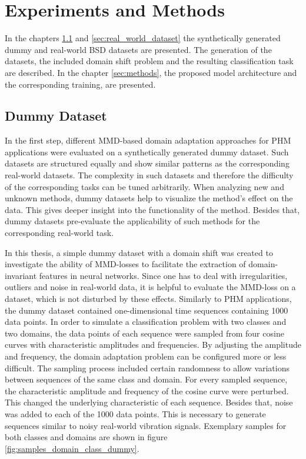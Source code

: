 \chapter{Experiments and Methods}\label{sec:experiments}
In the chapters \ref{sec:dummy_dataset} and \ref{sec:real_world_dataset} the synthetically generated dummy and real-world BSD datasets are presented. The generation of the datasets, the included domain shift problem and the resulting classification task are described. In the chapter \ref{sec:methods}, the proposed model architecture and the corresponding training, are presented. 
\section{Dummy Dataset}\label{sec:dummy_dataset}
In the first step, different MMD-based domain adaptation approaches for PHM applications were evaluated on a synthetically generated dummy dataset. Such datasets are structured equally and show similar patterns as the corresponding real-world datasets. The complexity in such datasets and therefore the difficulty of the corresponding tasks can be tuned arbitrarily. When analyzing new and unknown methods, dummy datasets help to visualize the method's effect on the data. This gives deeper insight into the functionality of the method. Besides that, dummy datasets pre-evaluate the applicability of such methods for the corresponding real-world task.

In this thesis, a simple dummy dataset with a domain shift was created to investigate the ability of MMD-losses to facilitate the extraction of domain-invariant features in neural networks. Since one has to deal with irregularities, outliers and noise in real-world data, it is helpful to evaluate the MMD-loss on a dataset, which is not disturbed by these effects. Similarly to PHM applications, the dummy dataset contained one-dimensional time sequences containing 1000 data points. In order to simulate a classification problem with two classes and two domains, the data points of each sequence were sampled from four cosine curves with characteristic amplitudes and frequencies. By adjusting the amplitude and frequency, the domain adaptation problem can be configured more or less difficult. The sampling process included certain randomness to allow variations between sequences of the same class and domain. For every sampled sequence, the characteristic amplitude and frequency of the cosine curve were perturbed. This changed the underlying characteristic of each sequence. Besides that, noise was added to each of the 1000 data points. This is necessary to generate sequences similar to noisy real-world vibration signals. Exemplary samples for both classes and domains are shown in figure \ref{fig:samples_domain_class_dummy}.

